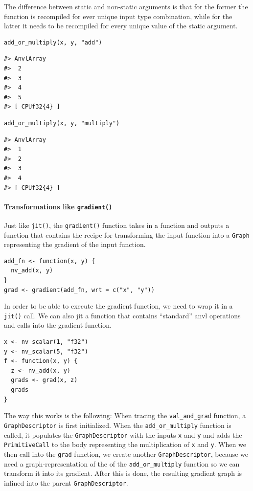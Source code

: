 The difference between static and non-static arguments is that for the former the function is recompiled for ever unique input type combination, while for the latter it needs to be recompiled for every unique value of the static argument.

\begin{verbatim}
add_or_multiply(x, y, "add")
\end{verbatim}

\begin{verbatim}
#> AnvlArray
#>  2
#>  3
#>  4
#>  5
#> [ CPUf32{4} ]
\end{verbatim}

\begin{verbatim}
add_or_multiply(x, y, "multiply")
\end{verbatim}

\begin{verbatim}
#> AnvlArray
#>  1
#>  2
#>  3
#>  4
#> [ CPUf32{4} ]
\end{verbatim}

\paragraph{\texorpdfstring{Transformations like \texttt{gradient()}}{Transformations like gradient()}}\label{transformations-like-gradient}

Just like \texttt{jit()}, the \texttt{gradient()} function takes in a function and outputs a function that contains the recipe for transforming the input function into a \texttt{Graph} representing the gradient of the input function.

\begin{verbatim}
add_fn <- function(x, y) {
  nv_add(x, y)
}
grad <- gradient(add_fn, wrt = c("x", "y"))
\end{verbatim}

In order to be able to execute the gradient function, we need to wrap it in a \texttt{jit()} call.
We can also jit a function that contains ``standard'' anvl operations and calls into the gradient function.

\begin{verbatim}
x <- nv_scalar(1, "f32")
y <- nv_scalar(5, "f32")
f <- function(x, y) {
  z <- nv_add(x, y)
  grads <- grad(x, z)
  grads
}
\end{verbatim}

The way this works is the following:
When tracing the \texttt{val\_and\_grad} function, a \texttt{GraphDescriptor} is first initialized.
When the \texttt{add\_or\_multiply} function is called, it populates the \texttt{GraphDescriptor} with the inputs \texttt{x} and \texttt{y} and adds the \texttt{PrimitiveCall} to the body representing the multiplication of \texttt{x} and \texttt{y}.
When we then call into the \texttt{grad} function, we create another \texttt{GraphDescriptor}, because we need a graph-representation of the of the \texttt{add\_or\_multiply} function so we can transform it into its gradient.
After this is done, the resulting gradient graph is inlined into the parent \texttt{GraphDescriptor}.

